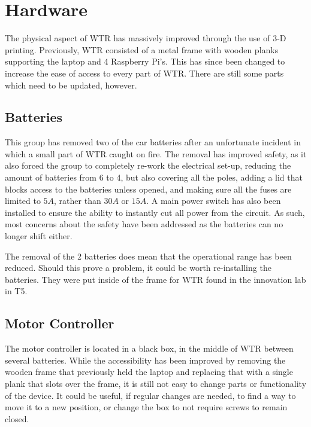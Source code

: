 \section{Hardware}
The physical aspect of WTR has massively improved through the use of 3-D printing.
Previously, WTR consisted of a metal frame with wooden planks supporting the laptop and 4 Raspberry Pi's.
This has since been changed to increase the ease of access to every part of WTR.
There are still some parts which need to be updated, however.

\subsection{Batteries}
This group has removed two of the car batteries after an unfortunate incident in which a small part of WTR caught on fire.
The removal has improved safety, as it also forced the group to completely re-work the electrical set-up, reducing the amount of batteries from 6 to 4, but also covering all the poles, adding a lid that blocks access to the batteries unless opened, and making sure all the fuses are limited to $5A$, rather than $30A$ or $15A$.
A main power switch has also been installed to ensure the ability to instantly cut all power from the circuit.
As such, most concerns about the safety have been addressed as the batteries can no longer shift either.

The removal of the 2 batteries does mean that the operational range has been reduced.
Should this prove a problem, it could be worth re-installing the batteries.
They were put inside of the frame for WTR found in the innovation lab in T5.

\subsection{Motor Controller}
The motor controller is located in a black box, in the middle of WTR between several batteries.
While the accessibility has been improved by removing the wooden frame that previously held the laptop and replacing that with a single plank that slots over the frame, it is still not easy to change parts or functionality of the device.
It could be useful, if regular changes are needed, to find a way to move it to a new position, or change the box to not require screws to remain closed.

